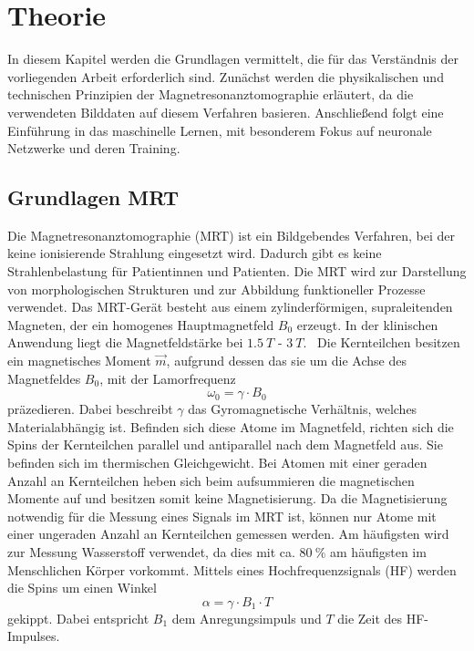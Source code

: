 \chapter{Theorie}
In diesem Kapitel werden die Grundlagen vermittelt, die für das Verständnis der vorliegenden Arbeit erforderlich sind. 
Zunächst werden die physikalischen und technischen Prinzipien der Magnetresonanztomographie erläutert, da die verwendeten Bilddaten auf diesem Verfahren basieren. 
Anschließend folgt eine Einführung in das maschinelle Lernen, mit besonderem Fokus auf neuronale Netzwerke und deren Training.
\section{Grundlagen MRT}
Die Magnetresonanztomographie (MRT) ist ein Bildgebendes Verfahren, bei der keine ionisierende Strahlung eingesetzt wird.
Dadurch gibt es keine Strahlenbelastung für Patientinnen und Patienten.
Die MRT wird zur Darstellung von morphologischen Strukturen und zur Abbildung funktioneller Prozesse verwendet.
Das MRT-Gerät besteht aus einem zylinderförmigen, supraleitenden Magneten, der ein homogenes Hauptmagnetfeld $B_0$ erzeugt. %
In der klinischen Anwendung liegt die Magnetfeldstärke bei $\qty{1.5}{T}$ - $\qty{3}{T}$.~\cite{Schlegel}
Die Kernteilchen besitzen ein magnetisches Moment $\vec{m}$, aufgrund dessen das sie um die Achse des Magnetfeldes $B_0$, mit der Lamorfrequenz 
\begin{equation}
    \omega_0 = \gamma \cdot B_0
\end{equation}
präzedieren. Dabei beschreibt $\gamma$ das Gyromagnetische Verhältnis, welches Materialabhängig ist.
Befinden sich diese Atome im Magnetfeld,
richten sich die Spins der Kernteilchen parallel und antiparallel nach dem Magnetfeld aus. Sie befinden sich im thermischen Gleichgewicht.
Bei Atomen mit einer geraden Anzahl an Kernteilchen heben sich beim aufsummieren die magnetischen Momente auf und besitzen somit keine
Magnetisierung. 
Da die Magnetisierung notwendig für die Messung eines Signals im MRT ist, können nur Atome mit einer ungeraden Anzahl an Kernteilchen gemessen werden.
Am häufigsten wird zur Messung Wasserstoff verwendet, da dies mit ca. $\qty{80}{\%}$ am häufigsten im Menschlichen Körper vorkommt.
Mittels eines Hochfrequenzsignals (HF) werden die Spins um einen Winkel
\begin{equation}
    \alpha = \gamma \cdot B_1 \cdot T 
\end{equation}
gekippt. Dabei entspricht $B_1$ dem Anregungsimpuls und $T$ die Zeit des HF-Impulses.
